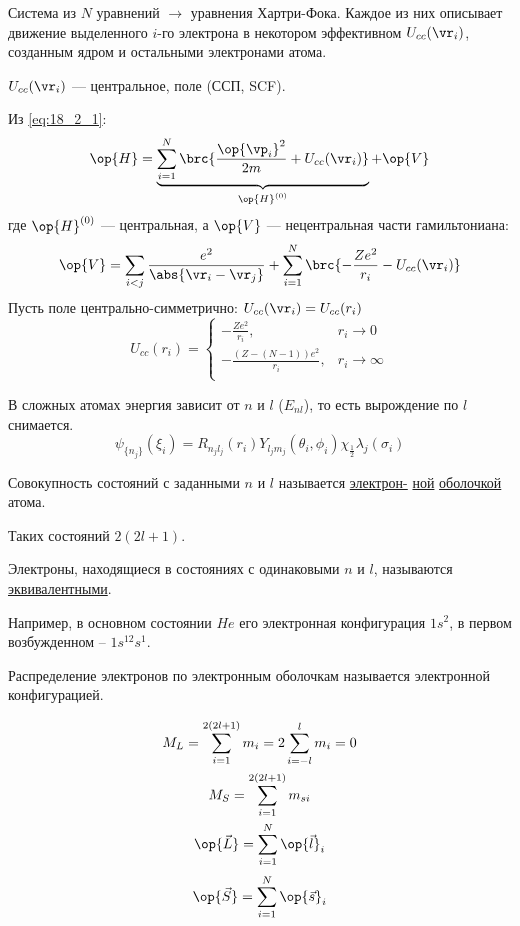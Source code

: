 Система из $N$ уравнений $\to$ уравнения Хартри-Фока. Каждое из них описывает движение выделенного $i$-го электрона в некотором эффективном  $U_{cc}(\vr_i)$, созданным ядром и остальными электронами атома. 

$U_{cc}(\vr_i)$ --- центральное,  поле (ССП, SCF).

Из \eqref{eq:18_2_1}:
$$
\op{H} = \underbrace{\sum_{i=1}^{N} \brc{\frac{\op{\vp_i}^2}{2m} + U_{cc}(\vr_i)}}_{\op{H}^{(0)}} + \op{V}
$$
где $\op{H}^{(0)}$ --- центральная, а $\op{V}$ --- нецентральная части гамильтониана:
$$
\op{V} = \sum_{i<j} \frac{e^2}{\abs{\vr_i - \vr_j}} + \sum_{i=1}^N \brc{-\frac{Ze^2}{r_i} - U_{cc}(\vr_i)}
$$
Пусть поле центрально-симметрично: $U_{cc}(\vr_i) = U_{cc}(r_i)$
$$
U_{cc}(r_i) =
\begin{cases}
-\frac{Ze^2}{r_i},& r_i \to 0\\
-\frac{(Z-(N-1))e^2}{r_i},& r_i \to \infty\\
\end{cases}
$$

В сложных атомах энергия зависит от $n$ и $l$ ($E_{nl}$), то есть вырождение по $l$ снимается.
$$
\psi_{\{n_j\}}(\xi_i) = R_{n_j l_j}(r_i) Y_{l_j m_j}(\theta_i, \phi_i) \chi_{\frac{1}{2}} \lambda_j(\sigma_i)
$$


\begin{defn}
Совокупность состояний с заданными $n$ и $l$ называется \underline{электрон-} \underline{ной} \underline{оболочкой} атома.
\end{defn}

Таких состояний $2(2l + 1)$.

\begin{defn}
Электроны, находящиеся в состояниях с одинаковыми $n$ и $l$, называются \underline{эквивалентными}.
\end{defn}

Например, в основном состоянии $He$ его электронная конфигурация  $1s^2$, в первом возбужденном -- $1s^12s^1$.

\begin{defn}
Распределение электронов по электронным оболочкам называется электронной конфигурацией. 
\end{defn}

\begin{gather*}
M_L = \sum_{i = 1}^{2(2l+1)} m_i = 2 \sum_{i=-l}^l m_i = 0 \\ 
M_S = \sum_{i = 1}^{2(2l+1)} m_{si} \\
\op{\vec{L}} = \sum_{i = 1}^{N} \op{\vec{l}}_i \\
\end{gather*}
\begin{equation}
\label{eq:18_2_3}
\op{\vec{S}} = \sum_{i = 1}^{N} \op{\vec{s}}_i
\end{equation}
